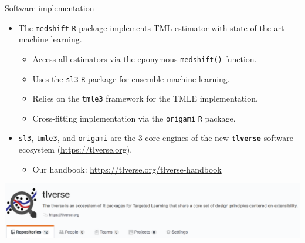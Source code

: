 \documentclass{beamer}
\begin{document}

\begin{frame}[c]{Software implementation}

\begin{center}
\begin{itemize}
  \itemsep2pt
  \item The \underline{\texttt{medshift} \texttt{R} package}
    \citep{hejazi2019medshift} implements TML estimator with state-of-the-art
    machine learning.
    \begin{itemize}
      \item Access all estimators via the eponymous \texttt{medshift()}
        function.
      \item Uses the \texttt{sl3} \texttt{R} package for ensemble machine
        learning.
      \item Relies on the \texttt{tmle3} framework for the TMLE implementation.
      \item Cross-fitting implementation via the \texttt{origami} \texttt{R}
        package.
    \end{itemize}
  \item \texttt{sl3}, \texttt{tmle3}, and \texttt{origami} are the 3 core
    engines of the new \textbf{\texttt{tlverse}} software ecosystem
    (\url{https://tlverse.org}).
    \begin{itemize}
      \item Our handbook: \url{https://tlverse.org/tlverse-handbook}
    \end{itemize}
\end{itemize}
\includegraphics[origin=c,scale=0.3]{tlverse}
\end{center}

\note{
}

\end{frame}


\end{document}
